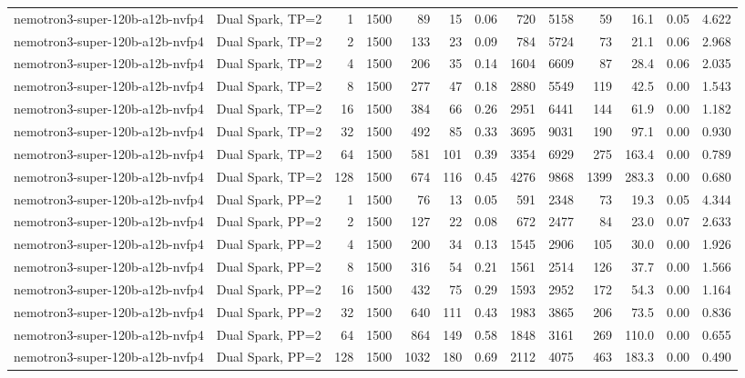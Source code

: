 \begin{tabular}{l l r r r r r r r r r r r}
\addlinespace
nemotron3-super-120b-a12b-nvfp4 & Dual Spark, TP=2 & 1 & 1500 & 89\rlap{$^\dagger$} & 15 & 0.06 & 720 & 5158 & 59 & 16.1 & 0.05 & 4.622 \\
nemotron3-super-120b-a12b-nvfp4 & Dual Spark, TP=2 & 2 & 1500 & 133 & 23 & 0.09 & 784 & 5724 & 73 & 21.1 & 0.06 & 2.968 \\
nemotron3-super-120b-a12b-nvfp4 & Dual Spark, TP=2 & 4 & 1500 & 206 & 35 & 0.14 & 1604 & 6609 & 87 & 28.4 & 0.06 & 2.035 \\
nemotron3-super-120b-a12b-nvfp4 & Dual Spark, TP=2 & 8 & 1500 & 277 & 47 & 0.18 & 2880 & 5549 & 119 & 42.5 & 0.00 & 1.543 \\
nemotron3-super-120b-a12b-nvfp4 & Dual Spark, TP=2 & 16 & 1500 & 384 & 66 & 0.26 & 2951 & 6441 & 144 & 61.9 & 0.00 & 1.182 \\
nemotron3-super-120b-a12b-nvfp4 & Dual Spark, TP=2 & 32 & 1500 & 492 & 85 & 0.33 & 3695 & 9031 & 190 & 97.1 & 0.00 & 0.930 \\
nemotron3-super-120b-a12b-nvfp4 & Dual Spark, TP=2 & 64 & 1500 & 581 & 101 & 0.39 & 3354 & 6929 & 275 & 163.4 & 0.00 & 0.789 \\
nemotron3-super-120b-a12b-nvfp4 & Dual Spark, TP=2 & 128 & 1500 & 674 & 116 & 0.45 & 4276 & 9868 & 1399 & 283.3 & 0.00 & 0.680 \\
\addlinespace
nemotron3-super-120b-a12b-nvfp4 & Dual Spark, PP=2 & 1 & 1500 & 76\rlap{$^\dagger$} & 13 & 0.05 & 591 & 2348 & 73 & 19.3 & 0.05 & 4.344 \\
nemotron3-super-120b-a12b-nvfp4 & Dual Spark, PP=2 & 2 & 1500 & 127 & 22 & 0.08 & 672 & 2477 & 84 & 23.0 & 0.07 & 2.633 \\
nemotron3-super-120b-a12b-nvfp4 & Dual Spark, PP=2 & 4 & 1500 & 200 & 34 & 0.13 & 1545 & 2906 & 105 & 30.0 & 0.00 & 1.926 \\
nemotron3-super-120b-a12b-nvfp4 & Dual Spark, PP=2 & 8 & 1500 & 316 & 54 & 0.21 & 1561 & 2514 & 126 & 37.7 & 0.00 & 1.566 \\
nemotron3-super-120b-a12b-nvfp4 & Dual Spark, PP=2 & 16 & 1500 & 432 & 75 & 0.29 & 1593 & 2952 & 172 & 54.3 & 0.00 & 1.164 \\
nemotron3-super-120b-a12b-nvfp4 & Dual Spark, PP=2 & 32 & 1500 & 640 & 111 & 0.43 & 1983 & 3865 & 206 & 73.5 & 0.00 & 0.836 \\
nemotron3-super-120b-a12b-nvfp4 & Dual Spark, PP=2 & 64 & 1500 & 864 & 149 & 0.58 & 1848 & 3161 & 269 & 110.0 & 0.00 & 0.655 \\
nemotron3-super-120b-a12b-nvfp4 & Dual Spark, PP=2 & 128 & 1500 & 1032 & 180 & 0.69 & 2112 & 4075 & 463 & 183.3 & 0.00 & 0.490 \\

\end{tabular}
